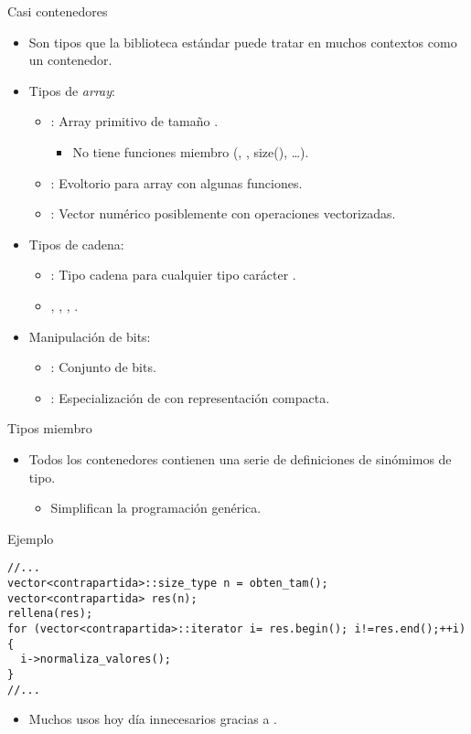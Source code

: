 \begin{frame}[t]{Casi contenedores}
\begin{itemize}
  \item Son tipos que la biblioteca estándar puede tratar en muchos contextos como un
        contenedor.
  \item Tipos de \emph{array}:
    \begin{itemize}
      \item {}: Array primitivo de tamaño .
        \begin{itemize}
          \item No tiene funciones miembro (, , size(), \ldots).
        \end{itemize}
      \item {}: Evoltorio para array con algunas funciones.
      \item {}: Vector numérico posiblemente con operaciones vectorizadas.
    \end{itemize}
  \item Tipos de cadena:
    \begin{itemize}
      \item {}: Tipo cadena para cualquier tipo carácter .
      \item {}, , , .
    \end{itemize}
  \item Manipulación de bits:
    \begin{itemize}
      \item {}: Conjunto de  bits.
      \item {}: Especialización de  con representación compacta.
    \end{itemize}
\end{itemize}
\end{frame}

\begin{frame}[t,fragile]{Tipos miembro}
\begin{itemize}
  \item Todos los contenedores contienen una serie de definiciones de sinómimos de tipo.
    \begin{itemize}
      \item Simplifican la programación genérica.
    \end{itemize}
\end{itemize}
\begin{block}{Ejemplo}
\begin{lstlisting}
//...
vector<contrapartida>::size_type n = obten_tam();
vector<contrapartida> res(n);
rellena(res);
for (vector<contrapartida>::iterator i= res.begin(); i!=res.end();++i) {
  i->normaliza_valores();
}
//...
\end{lstlisting}
\end{block}
\pause
\begin{itemize}
  \item Muchos usos hoy día innecesarios gracias a .
\end{itemize}
\end{frame}

